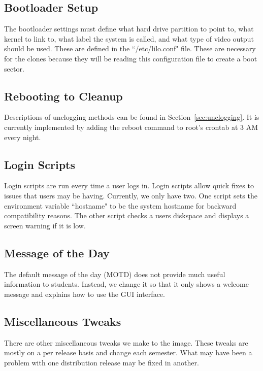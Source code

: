 \subsection{Bootloader Setup}
The bootloader settings must define what hard drive partition to point to, what kernel to link to, what label the system is called, and what type of video output should be used.  These are defined in the ``/etc/lilo.conf" file.  These are necessary for the clones because they will be reading this configuration file to create a boot sector.

\subsection{Rebooting to Cleanup}
Descriptions of unclogging methods can be found in Section~\ref{sec:unclogging}.  It is currently implemented by adding the reboot command to root's crontab at 3 AM every night.  

\subsection{Login Scripts}
Login scripts are run every time a user logs in.  Login scripts allow quick fixes to issues that users may be having.  Currently, we only have two.  One script sets the environment variable ``hostname" to be the system hostname for backward compatibility reasons.  The other script checks a users diskspace and displays a screen warning if it is low.  

\subsection{Message of the Day}
The default message of the day (MOTD) does not provide much useful information to students.  Instead, we change it so that it only shows a welcome message and explains how to use the GUI interface.  

\subsection{Miscellaneous Tweaks}
There are other miscellaneous tweaks we make to the image.  These tweaks are mostly on a per release basis and change each semester.  What may have been a problem with one distribution release may be fixed in another.  


